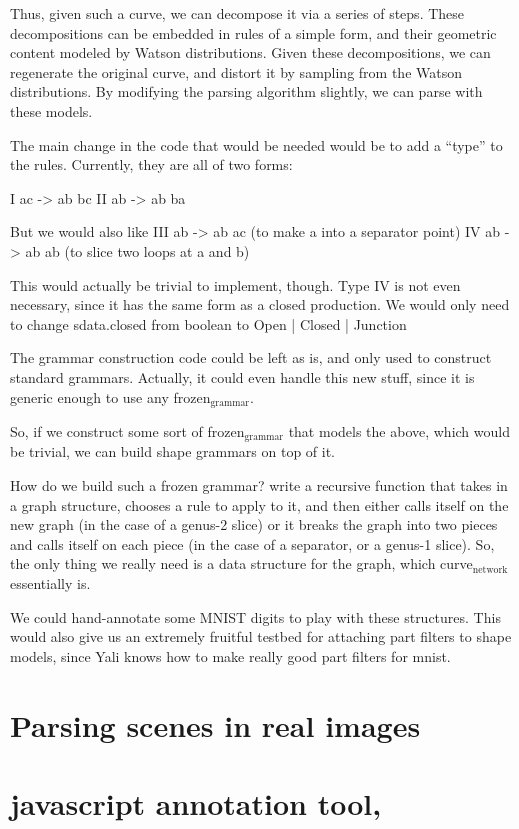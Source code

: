 \documentclass{book}
\begin{document}
Thus, given such a curve, we can decompose it via a series of
steps. These decompositions can be embedded in rules of a simple form,
and their geometric content modeled by Watson distributions. Given
these decompositions, we can regenerate the original curve, and
distort it by sampling from the Watson distributions. By modifying the
parsing algorithm slightly, we can parse with these models.

The main change in the code that would be needed would be to add a
``type'' to the rules. Currently, they are all of two forms:

I   ac -> ab bc
II  ab -> ab ba

But we would also like
III ab -> ab ac   (to make a into a separator point)
IV  ab -> ab ab   (to slice two loops at a and b)

This would actually be trivial to implement, though. Type IV is not
even necessary, since it has the same form as a closed production. We
would only need to change sdata.closed from boolean to Open | Closed |
Junction

The grammar construction code could be left as is, and only used to
construct standard grammars. Actually, it could even handle this new
stuff, since it is generic enough to use any frozen$_{\mathrm{grammar}}$.

So, if we construct some sort of frozen$_{\mathrm{grammar}}$ that models the above,
which would be trivial, we can build shape grammars on top of it.

How do we build such a frozen grammar? write a recursive function that
takes in a graph structure, chooses a rule to apply to it, and then
either calls itself on the new graph (in the case of a genus-2 slice)
or it breaks the graph into two pieces and calls itself on each piece
(in the case of a separator, or a genus-1 slice). So, the only thing
we really need is a data structure for the graph, which curve$_{\mathrm{network}}$
essentially is. 

We could hand-annotate some MNIST digits to play with these
structures. This would also give us an extremely fruitful testbed for
attaching part filters to shape models, since Yali knows how to make
really good part filters for mnist.
\section{Parsing scenes in real images}
\label{sec-6_17}
\section{javascript annotation tool,}
\label{sec-6_18}
\end{document}
